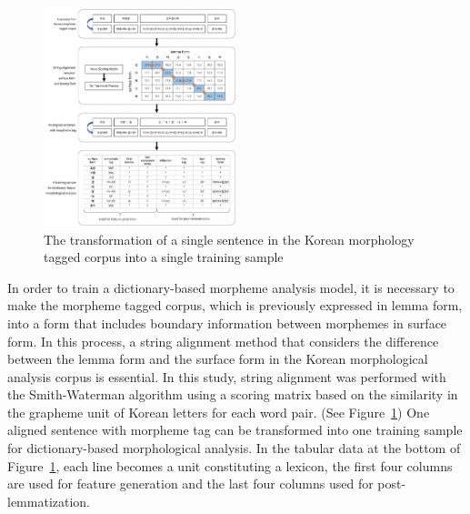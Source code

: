 \documentclass[AMS,STIX2COL]{WileyNJD-v2}
\begin{document}
    \begin{figure}[t]
        \centerline{\includegraphics[width=0.5\textwidth]{img/fig1}}
        \caption{The transformation of a single sentence in the Korean morphology tagged corpus into a single training sample}\label{fig:sample}
    \end{figure}

    In order to train a dictionary-based morpheme analysis model, it is necessary to make the morpheme tagged corpus, which is previously expressed in lemma form, into a form that includes boundary information between morphemes in surface form.
    In this process, a string alignment method that considers the difference between the lemma form and the surface form in the Korean morphological analysis corpus is essential.
    In this study, string alignment was performed with the Smith-Waterman algorithm using a scoring matrix based on the similarity in the grapheme unit of Korean letters for each word pair.
    (See Figure~\ref{fig:sample})
    One aligned sentence with morpheme tag can be transformed into one training sample for dictionary-based morphological analysis.
    In the tabular data at the bottom of Figure~\ref{fig:sample}, each line becomes a unit constituting a lexicon, the first four columns are used for feature generation and the last four columns used for post-lemmatization.

\end{document}
